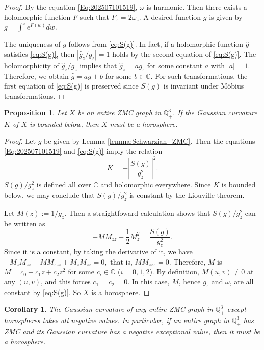 \documentclass[12pt,reqno]{amsart}
\theoremstyle{plain} %
\newtheorem{corollary}[theorem]{Corollary}
\newtheorem{proposition}[theorem]{Proposition}
\theoremstyle{definition}
\numberwithin{equation}{section}
\newcommand{\qthreep}{\mathbb{Q}^3_+}
\begin{document}
\begin{proof}
	By the equation \eqref{Eq:202507101519}, $\omega$ is harmonic. Then there exists a holomorphic function $F$ such that $F_z=2\omega_z$. A desired function $g$ is given by $g=\int^z e^{F(w)}dw$.

	The uniqueness of $g$ follows from \eqref{eq:S(g)}. In fact, if a holomorphic function $\hat{g}$ satisfies \eqref{eq:S(g)}, then $|\hat{g}_z/g_z|=1$ holds by the second equation of \eqref{eq:S(g)}. The holomorphicity of $\hat{g}_z/g_z$ implies that $\hat{g}_z=ag_z$ for some constant $a$ with $|a|=1$. Therefore, we obtain $\hat{g}=ag+b$ for some $b\in \mathbb{C}$. For such transformations, the first equation of \eqref{eq:S(g)} is preserved since $S(g)$ is invariant under M\"obius transformations.
\end{proof}


\begin{proposition}\label{prop:zmc}
	Let $X$ be an entire ZMC graph in $\qthreep$. If the Gaussian curvature $K$ of $X$ is bounded below, then $X$ must be a horosphere.
\end{proposition}
\begin{proof}
	Let $g$ be given by Lemma \ref{lemma:Schwarzian_ZMC}. Then
	the equations \eqref{Eq:202507101519} and \eqref{eq:S(g)} imply the relation
	\begin{equation}\label{eq:K_S(g)}
		K = -\left| \frac{S(g)}{g_z^2}\right|^2.
	\end{equation}
	$S(g)/g_z^2$ is defined all over $\mathbb{C}$ and holomorphic everywhere.
	Since $K$ is bounded below, we may conclude that $S(g)/g_z^2$ is constant by the Liouville theorem.

	Let $M(z) := 1/g_z$. Then a straightfoward calculation shows that $S(g)/g_z^2$ can be written as
	$$
		-M M_{zz} + \frac{1}{2} M_z^2 = \frac{S(g)}{g_z^2}.
	$$
	Since it is a constant, by taking the derivative of it, we have
	\(
	-M_zM_{zz}-MM_{zzz}+M_zM_{zz}=0,
	\)
	that is, $MM_{zzz}=0$. Therefore, $M$ is
	\(
	M=c_0+c_1z+c_2z^2
	\)
	for some $c_i\in \mathbb{C}$ ($i=0,1,2$). By definition, $M(u,v) \not= 0$ at any $(u,v)$, and this forces
	\(
	c_1=c_2=0.
	\)
	In this case,  $M$, hence $g_z$ and $\omega$, are all constant by \eqref{eq:S(g)}. So $X$ is a horosphere.
\end{proof}


\begin{corollary}
	The Gaussian curvature of any entire ZMC graph in $\qthreep$ except horospheres takes all negative values. In particular,
	if an entire graph in $\qthreep$ has ZMC and its Gaussian curvature has a negative exceptional value, then it must be a horosphere.
\end{corollary}
\end{document}
